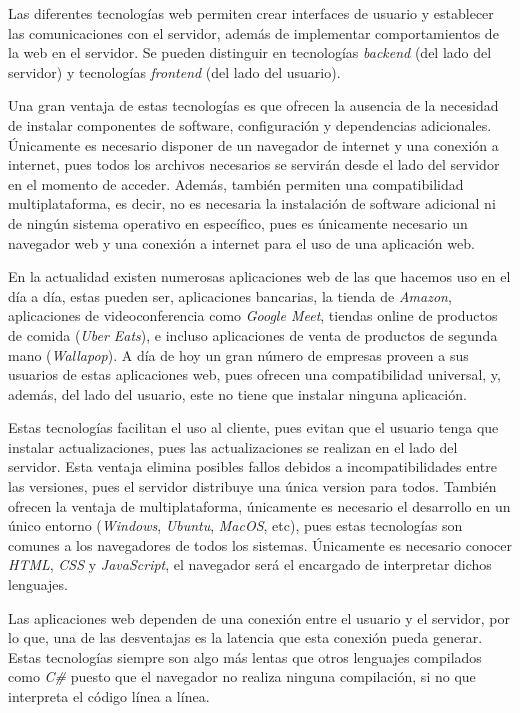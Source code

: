 \documentclass[a4paper, 12pt]{book}
\begin{document}
Las diferentes tecnologías web permiten crear interfaces de usuario y establecer las comunicaciones con el servidor, además de implementar comportamientos de la web en el servidor. Se pueden distinguir en tecnologías \emph{backend} (del lado del servidor) y tecnologías \emph{frontend} (del lado del usuario).

Una gran ventaja de estas tecnologías es que ofrecen la ausencia de la necesidad de instalar componentes de software, configuración y dependencias adicionales. Únicamente es necesario disponer de un navegador de internet y una conexión a internet, pues todos los archivos necesarios se servirán desde el lado del servidor en el momento de acceder. Además, también permiten una compatibilidad multiplataforma, es decir, no es necesaria la instalación de software adicional ni de ningún sistema operativo en específico, pues es únicamente necesario un navegador web y una conexión a internet para el uso de una aplicación web.

En la actualidad existen numerosas aplicaciones web de las que hacemos uso en el día a día, estas pueden ser, aplicaciones bancarias, la tienda de \emph{Amazon}, aplicaciones de videoconferencia como \emph{Google Meet}, tiendas online de productos de comida (\emph{Uber Eats}), e incluso aplicaciones de venta de productos de segunda mano (\emph{Wallapop}). A día de hoy un gran número de empresas proveen a sus usuarios de estas aplicaciones web, pues ofrecen una compatibilidad universal, y, además, del lado del usuario, este no tiene que instalar ninguna aplicación. 

Estas tecnologías facilitan el uso al cliente, pues evitan que el usuario tenga que instalar actualizaciones, pues las actualizaciones se realizan en el lado del servidor. Esta ventaja elimina posibles fallos debidos a incompatibilidades entre las versiones, pues el servidor distribuye una única version para todos. También ofrecen la ventaja de multiplataforma, únicamente es necesario el desarrollo en un único entorno (\emph{Windows}, \emph{Ubuntu}, \emph{MacOS}, etc), pues estas tecnologías son comunes a los navegadores de todos los sistemas. Únicamente es necesario conocer \emph{HTML}, \emph{CSS} y \emph{JavaScript}, el navegador será el encargado de interpretar dichos lenguajes.

Las aplicaciones web dependen de una conexión entre el usuario y el servidor, por lo que, una de las desventajas es la latencia que esta conexión pueda generar. Estas tecnologías siempre son algo más lentas que otros lenguajes compilados como \emph{C\#} puesto que el navegador no realiza ninguna compilación, si no que interpreta el código línea a línea.
\end{document}
